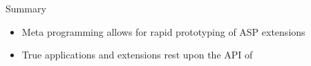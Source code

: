 \begin{frame}[c]{Summary}
  \begin{itemize}
  \item Meta programming allows for rapid prototyping of ASP extensions
  \item True applications and extensions rest upon the API of \clingo
  \end{itemize}
\end{frame}
%
